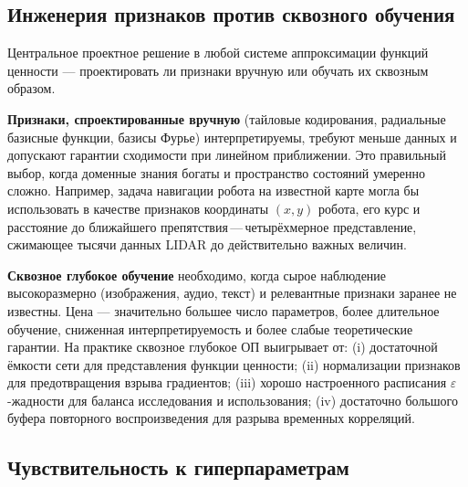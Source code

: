 \subsection{Инженерия признаков против сквозного обучения}

Центральное проектное решение в любой системе аппроксимации функций ценности --- проектировать ли признаки вручную или обучать их сквозным образом.

\textbf{Признаки, спроектированные вручную} (тайловые кодирования, радиальные базисные функции, базисы Фурье) интерпретируемы, требуют меньше данных и допускают гарантии сходимости при линейном приближении.  Это правильный выбор, когда доменные знания богаты и пространство состояний умеренно сложно.  Например, задача навигации робота на известной карте могла бы использовать в качестве признаков координаты $(x, y)$ робота, его курс и расстояние до ближайшего препятствия\,---\,четырёхмерное представление, сжимающее тысячи данных LIDAR до действительно важных величин.

\textbf{Сквозное глубокое обучение} необходимо, когда сырое наблюдение высокоразмерно (изображения, аудио, текст) и релевантные признаки заранее не известны.  Цена --- значительно большее число параметров, более длительное обучение, сниженная интерпретируемость и более слабые теоретические гарантии.  На практике сквозное глубокое ОП выигрывает от: (i) достаточной ёмкости сети для представления функции ценности; (ii) нормализации признаков для предотвращения взрыва градиентов; (iii) хорошо настроенного расписания $\varepsilon$-жадности для баланса исследования и использования; (iv) достаточно большого буфера повторного воспроизведения для разрыва временных корреляций.

\subsection{Чувствительность к гиперпараметрам}

